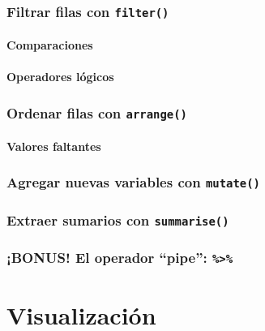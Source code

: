 \documentclass[]{book}
\begin{document}
\subsection{\texorpdfstring{Filtrar filas con
\texttt{filter()}}{Filtrar filas con filter()}}\label{filtrar-filas-con-filter}

\subsubsection{Comparaciones}\label{comparaciones}

\subsubsection{Operadores lógicos}\label{operadores-logicos}

\subsection{\texorpdfstring{Ordenar filas con
\texttt{arrange()}}{Ordenar filas con arrange()}}\label{ordenar-filas-con-arrange}

\subsubsection{Valores faltantes}\label{valores-faltantes}

\subsection{\texorpdfstring{Agregar nuevas variables con
\texttt{mutate()}}{Agregar nuevas variables con mutate()}}\label{agregar-nuevas-variables-con-mutate}

\subsection{\texorpdfstring{Extraer sumarios con
\texttt{summarise()}}{Extraer sumarios con summarise()}}\label{extraer-sumarios-con-summarise}

\subsection{\texorpdfstring{¡BONUS! El operador ``pipe'':
\texttt{\%\textgreater{}\%}}{¡BONUS! El operador pipe: \%\textgreater{}\%}}\label{bonus-el-operador-pipe}

\chapter{Visualización}\label{visualizacion}
\end{document}
